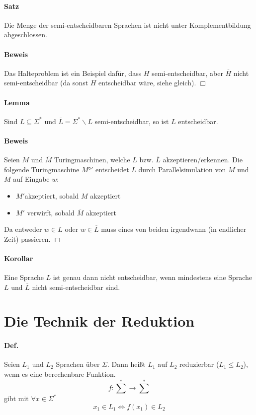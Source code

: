 \paragraph*{Satz} Die Menge der semi-entscheidbaren Sprachen ist nicht unter Komplementbildung abgeschlossen.

\paragraph*{Beweis} Das Halteproblem ist ein Beispiel dafür, dass $H$ semi-entscheidbar, aber $\overline{H}$ nicht semi-entscheidbar (da sonst $H$ entscheidbar wäre, siehe gleich). $\Box$

\paragraph{Lemma} Sind $L \subseteq \Sigma^*$ und $\overline{L}=\Sigma^*\backslash L$ semi-entscheidbar, so ist $L$ entscheidbar.

\paragraph*{Beweis} Seien $M$ und $\overline{M}$ Turingmaschinen, welche $L$ bzw. $\overline{L}$ akzeptieren/erkennen. Die folgende Turingmaschine $M°'$ entscheidet $L$ durch Parallelsimulation von $M$ und $\overline{M}$ auf Eingabe $w$:
\begin{itemize}
	\item $M'$akzeptiert, sobald $M$ akzeptiert
	\item $M'$ verwirft, sobald $\overline{M}$ akzeptiert
\end{itemize}
Da entweder $w\in L$ oder $w\in \overline{L}$ muss eines von beiden irgendwann (in endlicher Zeit) passieren. $\Box$

\paragraph*{Korollar} Eine Sprache $L$ ist genau dann nicht entscheidbar, wenn mindestens eine Sprache $L$ und $\overline{L}$ nicht semi-entscheidbar sind.


\section{Die Technik der Reduktion}

\paragraph*{Def.} Seien $L_1$ und $L_2$ Sprachen über $\Sigma$. Dann heißt $L_1$ auf $L_2$ reduzierbar ($L_1 \leq L_2$), wenn es eine berechenbare Funktion. $$ f: \sum^* \rightarrow \sum^* $$ gibt mit $\forall x \in \Sigma^*$ $$ x_1 \in L_1 \Leftrightarrow f(x_1) \in L_2 $$

